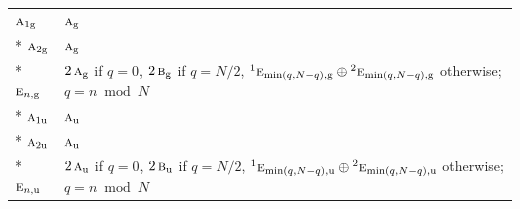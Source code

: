\documentclass[10pt,a4paper]{article}
\numberwithin{equation}{section}
\newcommand{\irr}[1]{\text{\normalfont\scshape #1}}
\newcommand{\conjpair}[1]{{}^{#1}}
\newcommand{\ptag}[1]{\mathrm{#1}}
\newlength{\fillwidth}\newlength{\cellwidth}\newlength{\colwidth}
\begin{document}
{\begin{longtable}{@{}l>{\raggedright\arraybackslash}p{\fillwidth}@{}}
$\irr{a}_{1\ptag{g}}$ & $\irr{a}_{\ptag{g}}$\\*
$\irr{a}_{2\ptag{g}}$ & $\irr{a}_{\ptag{g}}$\\*
$\irr{e}_{n,\ptag{g}}$ & $2\,\irr{a}_{\ptag{g}}$ if $q = 0$, $2\,\irr{b}_{\ptag{g}}$ if $q = N/2$, $\conjpair{1}\irr{e}_{\min(q, N-q),\ptag{g}}\oplus \conjpair{2}\irr{e}_{\min(q, N-q),\ptag{g}}$ otherwise; $q = n \bmod N$\\*
$\irr{a}_{1\ptag{u}}$ & $\irr{a}_{\ptag{u}}$\\*
$\irr{a}_{2\ptag{u}}$ & $\irr{a}_{\ptag{u}}$\\*
$\irr{e}_{n,\ptag{u}}$ & $2\,\irr{a}_{\ptag{u}}$ if $q = 0$, $2\,\irr{b}_{\ptag{u}}$ if $q = N/2$, $\conjpair{1}\irr{e}_{\min(q, N-q),\ptag{u}}\oplus \conjpair{2}\irr{e}_{\min(q, N-q),\ptag{u}}$ otherwise; $q = n \bmod N$\\
\bottomrule\end{longtable}}
\end{document}
